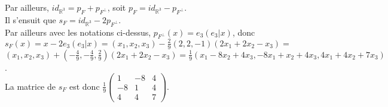 \documentclass[a4paper, 10pt]{article}
\theoremstyle{plain}
\newcommand{\R}{\mathbb{R}}
\begin{document}
\begin{enumerate}
Par ailleurs,  
$id_{\R^3} = p_F + p_{F^{\perp} } $, soit 
$p_F = id_{\R^3} -p_{F^{\perp} } $. \\
Il s'ensuit que 
$s_F = id_{\R^3} - 2p_{F^{\perp} }$.\\
Par ailleurs avec les notations ci-dessus, 
$p_{F^{\perp}} (x) = e_3 (e_3 | x )$, donc \\
$s_F (x) = x -2e_3(e_3 |x) = 
 (x_1,x_2,x_3) - \frac{2}{9} (2,2,-1) (2 x_1+2x_2-x_3) =$\\ 
 $(x_1,x_2,x_3) + (-\frac{4}{9}, - \frac{4}{9}, \frac{2}{9}) (2x_1+2x_2-x_3) = 
\frac{1}{9}(x_1 -8x_2 +4x_3 , -8x_1 +x_2 +4x_3, 4x_1 +4x_2 +7x_3)$.\\
La matrice de $s_F$ est donc 
 $
 \frac{1}{9}\begin{pmatrix}
 1&-8&4\\
 -8&1&4\\
 4&4&7
 \end{pmatrix}$.
 
\end{enumerate}
\end{document}
